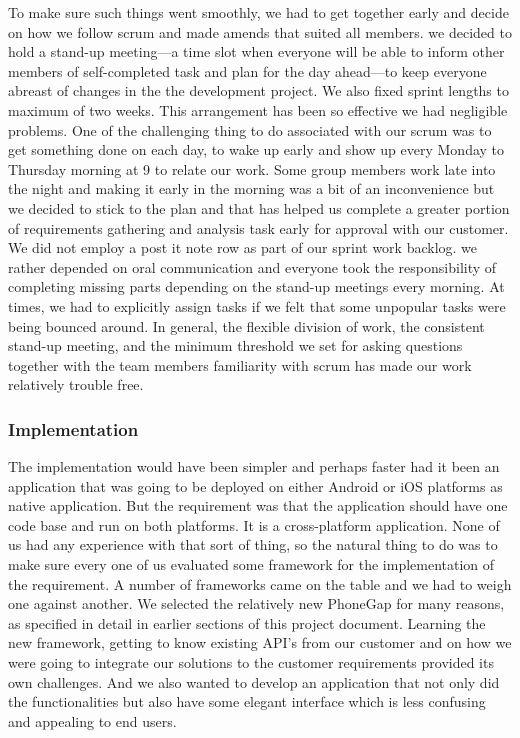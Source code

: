 To make sure such things went smoothly, we had to get together early and decide on how we follow scrum and made amends that suited all members. we decided to hold a stand-up meeting---a time slot when everyone will be able to inform other members of self-completed task and plan for the day ahead---to keep everyone abreast of changes in the the development project. We also fixed sprint lengths to maximum of two weeks. This arrangement has been so effective we had negligible problems. One of the challenging thing to do associated with our scrum was to get something done on each day, to wake up early and show up every Monday to Thursday morning at 9 to relate our work. Some group members work late into the night and making it early in the morning was a bit of an inconvenience but we decided to stick to the plan and that has helped us complete a greater portion of requirements gathering and analysis task early for approval with our customer. We did not employ a post it note row as part of our sprint work backlog. we rather depended on oral communication and everyone took the responsibility of completing missing parts depending on the stand-up meetings every morning. At times, we had to explicitly assign tasks if we felt that some unpopular tasks were being bounced around. In general, the flexible division of work, the consistent stand-up meeting, and the minimum threshold we set for asking questions together with the team members familiarity with scrum has made our work relatively trouble free.
	\subsubsection{Implementation}
The implementation would have been simpler and perhaps faster had it been an application that was going to be deployed on either Android or iOS platforms as native application.
But the requirement was that the application should have one code base and run on both platforms.
It is a cross-platform application.
None of us had any experience with that sort of thing, so the natural thing to do was to make sure every one of us evaluated some framework for the implementation of the requirement.
A number of frameworks came on the table and we had to weigh one against another.
We selected the relatively new PhoneGap for many reasons, as specified in detail in earlier sections of this project document.
Learning the new framework, getting to know existing API's from our customer and on how we were going to integrate our solutions to the customer requirements provided its own challenges.
And we also wanted to develop an application that not only did the functionalities but also have some elegant interface which is less confusing and appealing to end users.

